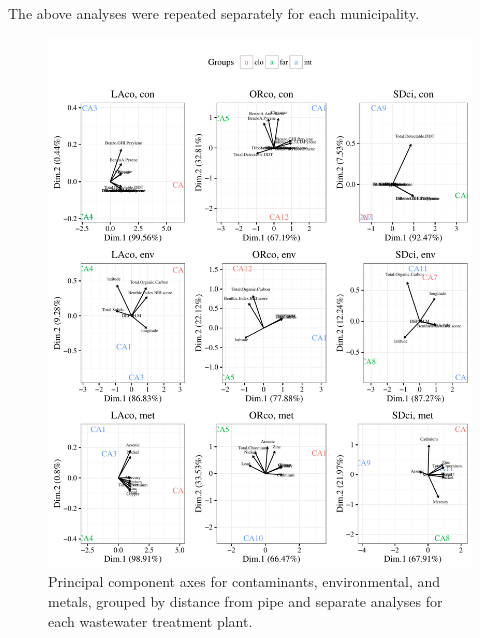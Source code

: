 \documentclass[letterpaper,12pt]{article}\usepackage[]{graphicx}\usepackage[]{color}
\newenvironment{knitrout}{}{} %
\begin{document}
The above analyses were repeated separately for each municipality. 

\begin{knitrout}
\color{fgcolor}\begin{figure}[!ht]

{\centering \includegraphics[width=\textwidth]{figs/unnamed-chunk-8-1} 

}

\caption[Principal component axes for contaminants, environmental, and metals, grouped by distance from pipe and separate analyses for each wastewater treatment plant]{Principal component axes for contaminants, environmental, and metals, grouped by distance from pipe and separate analyses for each wastewater treatment plant.}\label{fig:unnamed-chunk-8}
\end{figure}


\end{knitrout}
\end{document}
